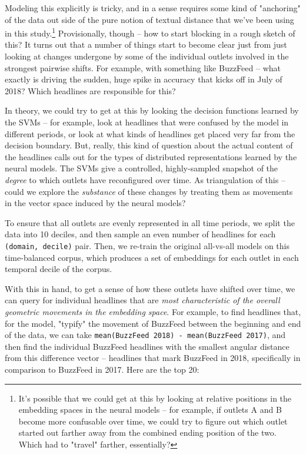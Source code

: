 \documentclass{scrartcl}
\begin{document}
Modeling this explicitly is tricky, and in a sense requires some kind of "anchoring" of the data out side of the pure notion of textual distance that we've been using in this study.\footnote{It's possible that we could get at this by looking at relative positions in the embedding spaces in the neural models -- for example, if outlets A and B become more confusable over time, we could try to figure out which outlet started out farther away from the combined ending position of the two. Which had to "travel" farther, essentially?} Provisionally, though -- how to start blocking in a rough sketch of this? It turns out that a number of things start to become clear just from just looking at changes undergone by some of the individual outlets involved in the strongest pairwise shifts. For example, with something like BuzzFeed -- what exactly is driving the sudden, huge spike in accuracy that kicks off in July of 2018? Which headlines are responsible for this?

In theory, we could try to get at this by looking the decision functions learned by the SVMs -- for example, look at headlines that were confused by the model in different periods, or look at what kinds of headlines get placed very far from the decision boundary. But, really, this kind of question about the actual content of the headlines calls out for the types of distributed representations learned by the neural models. The SVMs give a controlled, highly-sampled snapshot of the \textit{degree} to which outlets have reconfigured over time. As triangulation of this -- could we explore the \textit{substance} of these changes by treating them as movements in the vector space induced by the neural models?

To ensure that all outlets are evenly represented in all time periods, we split the data into 10 deciles, and then sample an even number of headlines for each \texttt{(domain, decile)} pair. Then, we re-train the original all-vs-all models on this time-balanced corpus, which produces a set of embeddings for each outlet in each temporal decile of the corpus.

With this in hand, to get a sense of how these outlets have shifted over time, we can query for individual headlines that are \textit{most characteristic of the overall geometric movements in the embedding space}. For example, to find headlines that, for the model, "typify" the movement of BuzzFeed between the beginning and end of the data, we can take \texttt{mean(BuzzFeed 2018) - mean(BuzzFeed 2017)}, and then find the individual BuzzFeed headlines with the smallest angular distance from this difference vector -- headlines that mark BuzzFeed in 2018, specifically in comparison to BuzzFeed in 2017. Here are the top 20:
\end{document}
